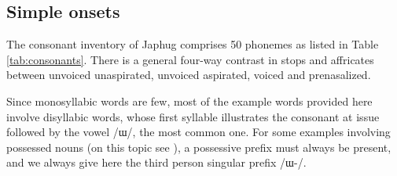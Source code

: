 \documentclass[oneside,a4paper,11pt]{article}
\newcommand{\ipa}[1]{\mbox{\phon/#1/}}
\begin{document}
 \subsection*{Simple onsets} \label{sec:simple}

 The consonant inventory of Japhug comprises 50 phonemes as listed in Table \ref{tab:consonants}. There is a general four-way contrast in stops and affricates between unvoiced unaspirated, unvoiced aspirated, voiced and prenasalized.
 
Since monosyllabic words are few,  most of the example words provided here involve disyllabic words, whose first syllable illustrates the consonant at issue followed by the vowel \ipa{ɯ}, the most common one. For some examples involving possessed nouns (on this topic see \citealt[6]{jacques14antipassive}), a possessive prefix must always be present, and we always give here the third person singular prefix  \ipa{ɯ-}.
 
\end{document}
